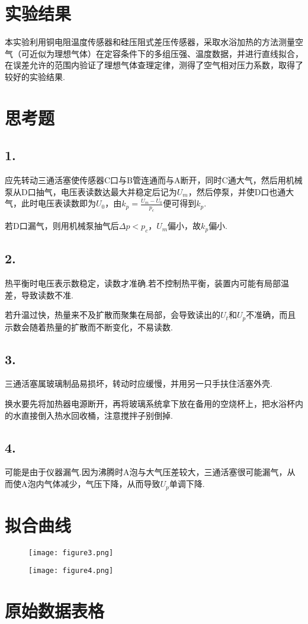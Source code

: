 \documentclass{thureport}
\begin{document}
\section{实验结果}
本实验利用铜电阻温度传感器和硅压阻式差压传感器，采取水浴加热的方法测量空气（可近似为理想气体）在定容条件下的多组压强、温度数据，并进行直线拟合，在误差允许的范围内验证了理想气体查理定律，测得了空气相对压力系数，取得了较好的实验结果.

\section{思考题}
\subsection*{1.}
应先转动三通活塞使传感器C口与B管连通而与A断开，同时C通大气，然后用机械泵从D口抽气，电压表读数达最大并稳定后记为$U_m$，然后停泵，并使D口也通大气，此时电压表读数即为$U_0$，由$k_p=\frac{U_m-U_0}{p_c}$便可得到$k_p$.

若D口漏气，则用机械泵抽气后$\Delta p<p_c$，$U_m$偏小，故$k_p$偏小.

\subsection*{2.}
热平衡时电压表示数稳定，读数才准确.若不控制热平衡，装置内可能有局部温差，导致读数不准.

若升温过快，热量来不及扩散而聚集在局部，会导致读出的$U_t$和$U_p$不准确，而且示数会随着热量的扩散而不断变化，不易读数.

\subsection*{3.}
三通活塞属玻璃制品易损坏，转动时应缓慢，并用另一只手扶住活塞外壳.

换水要先将加热器电源断开，再将玻璃系统拿下放在备用的空烧杯上，把水浴杯内的水直接倒入热水回收桶，注意搅拌子别倒掉.

\subsection*{4.}
可能是由于仪器漏气.因为沸腾时A泡与大气压差较大，三通活塞很可能漏气，从而使A泡内气体减少，气压下降，从而导致$U_p$单调下降.

\clearpage
\section{拟合曲线}
\begin{figure}[h]
	\centering
	\texttt{[image: figure3.png]}
\end{figure}

\begin{figure}[h]
	\centering
	\texttt{[image: figure4.png]}
\end{figure}

\newpage
\section{原始数据表格}
\end{document}
